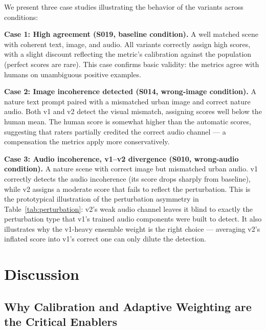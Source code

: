 \documentclass[a4paper,fleqn]{cas-sc}
\begin{document}
\begin{itemize}
We present three case studies illustrating the behavior of the variants across conditions:

\textbf{Case 1: High agreement (S019, baseline condition).} A well matched scene with coherent text, image, and audio. All variants correctly assign high scores, with a slight discount reflecting the metric's calibration against the population (perfect scores are rare). This case confirms basic validity: the metrics agree with humans on unambiguous positive examples.

\textbf{Case 2: Image incoherence detected (S014, wrong-image condition).} A nature text prompt paired with a mismatched urban image and correct nature audio. Both v1 and v2 detect the visual mismatch, assigning scores well below the human mean. The human score is somewhat higher than the automatic scores, suggesting that raters partially credited the correct audio channel — a compensation the metrics apply more conservatively.

\textbf{Case 3: Audio incoherence, v1--v2 divergence (S010, wrong-audio condition).} A nature scene with correct image but mismatched urban audio. v1 correctly detects the audio incoherence (its score drops sharply from baseline), while v2 assigns a moderate score that fails to reflect the perturbation. This is the prototypical illustration of the perturbation asymmetry in Table~\ref{tab:perturbation}: v2's weak audio channel leaves it blind to exactly the perturbation type that v1's trained audio components were built to detect. It also illustrates why the v1-heavy ensemble weight is the right choice — averaging v2's inflated score into v1's correct one can only dilute the detection.

\section{Discussion}

\subsection{Why Calibration and Adaptive Weighting are the Critical Enablers}\label{sec:calibration-discussion}


\end{itemize}
\end{document}
